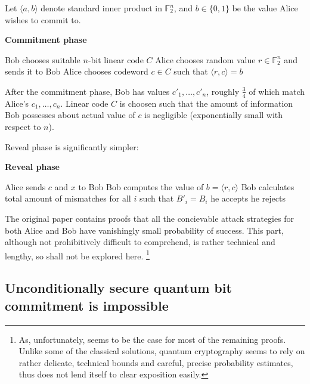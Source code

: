 \documentclass[10pt]{article}
\begin{document}
Let \(\langle a,b\rangle\) denote standard inner product in \(\mathbb{F}_2^n\), and \(b\in\{0,1\}\) 
be the value Alice wishes to commit to.


\NoCaptionOfAlgo
\begin{algorithm}[H]
\caption{\textbf{Commitment phase}}
Bob chooses suitable \(n\)-bit linear code \(C\) \;
Alice chooses random value \(r\in\mathbb{F}_2^n\) and sends it to Bob \;
Alice chooses codeword \(c\in C\) such that \(\langle r,c\rangle = b\) \;
\end{algorithm}

After the commitment phase, Bob has values \(c'_1,\ldots,c'_n\), roughly \(\frac{3}{4}\) of 
which match Alice's \(c_1,\ldots,c_n\). Linear code \(C\) is choosen such that the amount of
information Bob possesses about actual value of \(c\) is negligible (exponentially small with
respect to \(n\)).

Reveal phase is significantly simpler:

\NoCaptionOfAlgo
\begin{algorithm}[H]
\caption{\textbf{Reveal phase}}
Alice sends \(c\) and \(x\) to Bob \;
Bob computes the value of \(b=\langle r,c\rangle\) \;
Bob calculates total amount of mismatches for all \(i\) such that \(B'_i=B_i\) \;
 {
  he accepts
}{
  he rejects
}
\end{algorithm}

The original paper contains proofs that all the concievable attack strategies for both Alice
and Bob have vanishingly small probability of success. This part, although not prohibitively
difficult to comprehend, is rather technical and lengthy, so shall not be explored here.
\footnote{As, unfortunately, seems to be the case for most of the remaining proofs. Unlike
some of the classical solutions, quantum cryptography seems to rely on rather delicate, technical
bounds and careful, precise probability estimates, thus does not lend itself to clear exposition
easily.}

\subsection*{Unconditionally secure quantum bit commitment is impossible}
\end{document}

